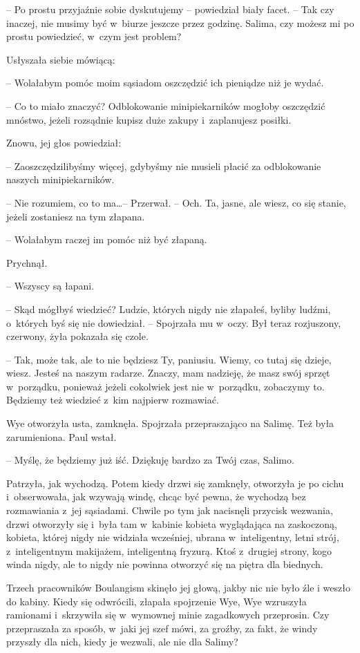 \documentclass[oneside,polish,11pt,sfheadings]{mwbk}
\begin{document}
-- Po prostu przyjaźnie sobie dyskutujemy -- powiedział biały facet. -- Tak
czy inaczej, nie musimy być w~biurze jeszcze przez godzinę. Salima, czy
możesz mi po prostu powiedzieć, w~czym jest problem?

Usłyszała siebie mówiącą: 

-- Wolałabym pomóc moim sąsiadom oszczędzić ich
pieniądze niż je wydać.

-- Co to miało znaczyć? Odblokowanie minipiekarników mogłoby oszczędzić
mnóstwo, jeżeli rozsądnie kupisz duże zakupy i~zaplanujesz posiłki.

Znowu, jej głos powiedział: 

-- Zaoszczędzilibyśmy więcej, gdybyśmy nie
musieli płacić za odblokowanie naszych minipiekarników.

-- Nie rozumiem, co to ma\ldots  -- Przerwał. -- Och. Ta, jasne, ale wiesz, co
się stanie, jeżeli zostaniesz na tym złapana.

-- Wolałabym raczej im pomóc niż być złapaną.

Prychnął. 

-- Wszyscy są łapani.

-- Skąd mógłbyś wiedzieć? Ludzie, których nigdy nie złapałeś, byliby
ludźmi, o~których byś się nie dowiedział. -- Spojrzała mu w~oczy. Był
teraz rozjuszony, czerwony, żyła pokazała się czole.

-- Tak, może tak, ale to nie będziesz Ty, paniusiu. Wiemy, co tutaj się
dzieje, wiesz. Jesteś na naszym radarze. Znaczy, mam nadzieję, że masz
swój sprzęt w~porządku, ponieważ jeżeli cokolwiek jest nie w~porządku,
zobaczymy to. Będziemy też wiedzieć z~kim najpierw rozmawiać.

Wye otworzyła usta, zamknęła. Spojrzała przepraszająco na Salimę. Też
była zarumieniona. Paul wstał. 

-- Myślę, że będziemy już iść. Dziękuję
bardzo za Twój czas, Salimo.

Patrzyła, jak wychodzą. Potem kiedy drzwi się zamknęły, otworzyła je po
cichu i~obserwowała, jak wzywają windę, chcąc być pewna, że wychodzą bez
rozmawiania z~jej sąsiadami. Chwile po tym jak nacisnęli przycisk
wezwania, drzwi otworzyły się i~była tam w~kabinie kobieta wyglądająca
na zaskoczoną, kobieta, której nigdy nie widziała wcześniej, ubrana w~inteligentny, letni strój, z~inteligentnym makijażem, inteligentną
fryzurą. Ktoś z~drugiej strony, kogo winda nigdy, ale to nigdy nie
powinna otworzyć się na piętra dla biednych.

Trzech pracowników Boulangism skinęło jej głową, jakby nic nie było źle
i weszło do kabiny. Kiedy się odwrócili, złapała spojrzenie Wye, Wye
wzruszyła ramionami i~skrzywiła się w~wymownej minie zagadkowych
przeprosin. Czy przepraszała za sposób, w~jaki jej szef mówi, za groźby,
za fakt, że windy przyszły dla nich, kiedy je wezwali, ale nie dla
Salimy?
\end{document}
